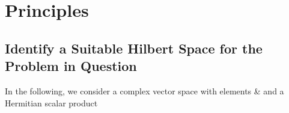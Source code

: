 \section{Principles}

\subsection{Identify a Suitable Hilbert Space for the Problem in Question}

In the following, we consider a complex vector space with elements &\ket{\psi} and a Hermitian scalar product